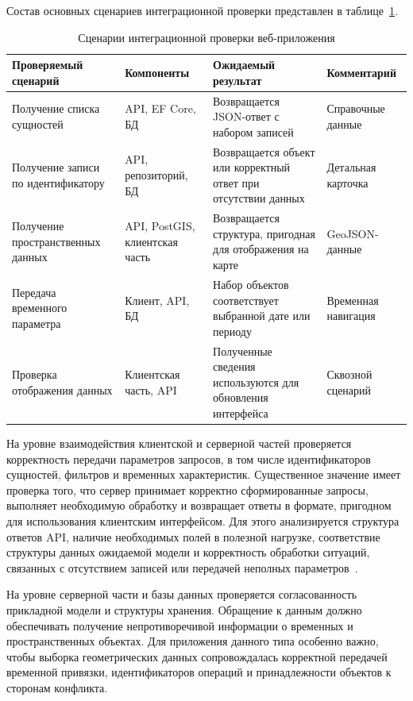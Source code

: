 Состав основных сценариев интеграционной проверки представлен в таблице~\ref{tab:integration-test-scenarios}.

\begin{table}[H]
\caption{Сценарии интеграционной проверки веб-приложения}
\label{tab:integration-test-scenarios}
\centering
\scriptsize
\begin{tabular}{|p{3.5cm}|p{3.1cm}|p{4.6cm}|p{2.3cm}|}
\hline
Проверяемый сценарий & Компоненты & Ожидаемый результат & Комментарий \\
\hline
Получение списка сущностей & API, EF Core, БД & Возвращается JSON-ответ с набором записей & Справочные данные \\
\hline
Получение записи по идентификатору & API, репозиторий, БД & Возвращается объект или корректный ответ при отсутствии данных & Детальная карточка \\
\hline
Получение пространственных данных & API, PostGIS, клиентская часть & Возвращается структура, пригодная для отображения на карте & GeoJSON-данные \\
\hline
Передача временного параметра & Клиент, API, БД & Набор объектов соответствует выбранной дате или периоду & Временная навигация \\
\hline
Проверка отображения данных & Клиентская часть, API & Полученные сведения используются для обновления интерфейса & Сквозной сценарий \\
\hline
\end{tabular}
\end{table}

На уровне взаимодействия клиентской и серверной частей проверяется корректность передачи параметров запросов, в том числе идентификаторов сущностей, фильтров и временных характеристик. Существенное значение имеет проверка того, что сервер принимает корректно сформированные запросы, выполняет необходимую обработку и возвращает ответы в формате, пригодном для использования клиентским интерфейсом. Для этого анализируется структура ответов API, наличие необходимых полей в полезной нагрузке, соответствие структуры данных ожидаемой модели и корректность обработки ситуаций, связанных с отсутствием записей или передачей неполных параметров~\cite{aspnet_docs}.

На уровне серверной части и базы данных проверяется согласованность прикладной модели и структуры хранения. Обращение к данным должно обеспечивать получение непротиворечивой информации о временных и пространственных объектах. Для приложения данного типа особенно важно, чтобы выборка геометрических данных сопровождалась корректной передачей временной привязки, идентификаторов операций и принадлежности объектов к сторонам конфликта.

